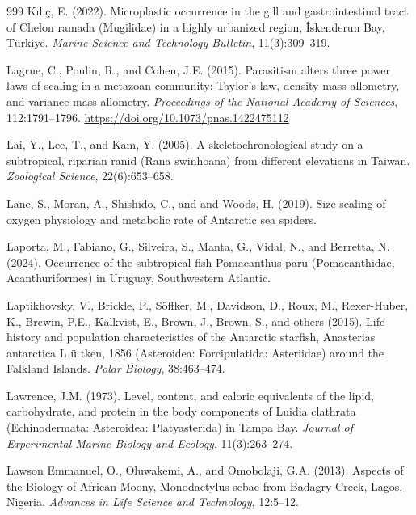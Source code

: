 \begin{thebibliography}{999}
K{\i}l{\i}{\c{c}}, E. (2022). Microplastic occurrence in the gill and gastrointestinal tract of Chelon ramada (Mugilidae) in a highly urbanized region, {\.I}skenderun Bay, T{\"u}rkiye. \textit{Marine Science and Technology Bulletin}, 11(3):309--319.

Lagrue, C., Poulin, R., and Cohen, J.E. (2015). Parasitism alters three power laws of scaling in a metazoan community: Taylor's law, density-mass allometry, and variance-mass allometry. \textit{Proceedings of the National Academy of Sciences}, 112:1791--1796. \url{https://doi.org/10.1073/pnas.1422475112}

Lai, Y., Lee, T., and Kam, Y. (2005). A skeletochronological study on a subtropical, riparian ranid (Rana swinhoana) from different elevations in Taiwan. \textit{Zoological Science}, 22(6):653--658.

Lane, S., Moran, A., Shishido, C., and and Woods, H. (2019). Size scaling of oxygen physiology and metabolic rate of Antarctic sea spiders.

Laporta, M., Fabiano, G., Silveira, S., Manta, G., Vidal, N., and Berretta, N. (2024). Occurrence of the subtropical fish Pomacanthus paru (Pomacanthidae, Acanthuriformes) in Uruguay, Southwestern Atlantic.

Laptikhovsky, V., Brickle, P., S{\"o}ffker, M., Davidson, D., Roux, M., Rexer-Huber, K., Brewin, P.E., K{\"a}lkvist, E., Brown, J., Brown, S., and others (2015). Life history and population characteristics of the Antarctic starfish, Anasterias antarctica L {\"u} tken, 1856 (Asteroidea: Forcipulatida: Asteriidae) around the Falkland Islands. \textit{Polar Biology}, 38:463--474.

Lawrence, J.M. (1973). Level, content, and caloric equivalents of the lipid, carbohydrate, and protein in the body components of Luidia clathrata (Echinodermata: Asteroidea: Platyasterida) in Tampa Bay. \textit{Journal of Experimental Marine Biology and Ecology}, 11(3):263--274.

Lawson Emmanuel, O., Oluwakemi, A., and Omobolaji, G.A. (2013). Aspects of the Biology of African Moony, Monodactylus sebae from Badagry Creek, Lagos, Nigeria. \textit{Advances in Life Science and Technology}, 12:5--12.


\end{thebibliography}
